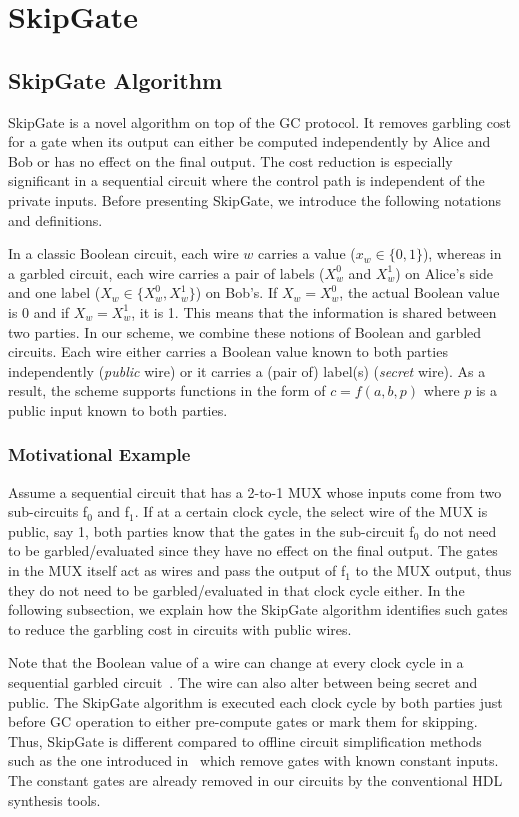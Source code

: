 \chapter{{SkipGate}}
\section{{SkipGate} Algorithm}
SkipGate is a novel algorithm on top of the GC protocol.
It removes garbling cost for a gate when its output can either be computed independently by Alice and Bob or has no effect on the final output.
The cost reduction is especially significant in a sequential circuit where the control path is independent of the private inputs.
Before presenting SkipGate, we introduce the following notations and definitions.

In a classic Boolean circuit, each wire $w$ carries a value ($x_w\in\{0, 1\}$), whereas in a garbled circuit, each wire carries a pair of labels ($X_w^{0}$ and $X_w^{1}$) on Alice's side and one label ($X_w \in \{X_w^{0}, X_w^{1}\}$) on Bob's.
If $X_w = X_w^{0}$, the actual Boolean value is 0 and if $X_w = X_w^{1}$, it is 1.
This means that the information is shared between two parties.
In our scheme, we combine these notions of Boolean and garbled circuits.
Each wire either carries a Boolean value known to both parties independently (\textit{public} wire) or it carries a (pair of) label(s) (\textit{secret} wire).
As a result, the scheme supports functions in the form of $c = f(a, b, p)$ where $p$ is a public input known to both parties.

\subsection{Motivational Example}
Assume a sequential circuit that has a 2-to-1 MUX whose inputs come from two sub-circuits f$_0$ and f$_1$.
If at a certain clock cycle, the select wire of the MUX is public, say 1, both parties know that the gates in the sub-circuit f$_0$ do not need to be garbled/evaluated since they have no effect on the final output.
The gates in the MUX itself act as wires and pass the output of f$_1$ to the MUX output, thus they do not need to be garbled/evaluated in that clock cycle either.
In the following subsection, we explain how the SkipGate algorithm identifies such gates to reduce the garbling cost in circuits with public wires.

Note that the Boolean value of a wire can change at every clock cycle in a sequential garbled circuit~\cite{songhori2015tinygarble}.
The wire can also alter between being secret and public.
The SkipGate algorithm is executed each clock cycle by both parties just before GC operation to either pre-compute gates or mark them for skipping.
Thus, SkipGate is different compared to offline circuit simplification methods such as the one introduced in~\cite{pinkas2009secure} which remove gates with known constant inputs.
The constant gates are already removed in our circuits by the conventional HDL synthesis tools.

